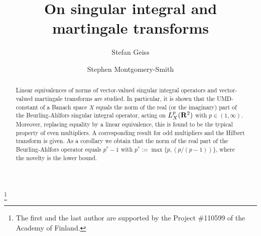 \documentclass[11pt,a4paper,twoside,draft]{amsart}
\theoremstyle{definition}
\newcommand{\real}{{\bf R}}
\begin{document}
\title[On singular integral and martingale transforms]
{On singular integral and martingale transforms}

\author{Stefan Geiss}
\address{University of Jyv\"askyl\"a, Department of Mathematics and Statistics,
         P.O. Box 35 (MaD), FIN-40014 University of Jyv\"askyl\"a, Finland}

\author{Stephen Montgomery-Smith}
\address{University of Missouri, Mathematics Department,
         Columbia, MO 65211 USA}

\author{}
\address{University of Helsinki, Department of Mathematics and Statistics,
         P.O. Box 68, FIN-00014 University of Helsinki, Finland}


\thanks{The first and the last author are supported by the Project \#110599
        of the Academy of Finland.}


\begin{abstract}  
Linear equivalences of norms of vector-valued singular integral operators and 
vector-valued martingale transforms are studied. In particular, 
it is shown that the UMD-constant of a Banach space $X$ equals 
the norm of the real (or the imaginary) part of the Beurling-Ahlfors singular 
integral operator, acting on $L^p_X(\real^2)$ with $p\in (1,\infty).$ 
Moreover, replacing equality by a linear equivalence, this is found to be the 
typical property of even multipliers.  A corresponding result for odd multipliers 
and the Hilbert transform is given. As a corollary we obtain that the norm of the 
real part of the Beurling-Ahlfors operator equals $p^*-1$ with 
$p^*:= \max \{p, (p/(p-1))\}$, where the novelty is the lower bound. 
\end{abstract} 

\maketitle

\end{document}

